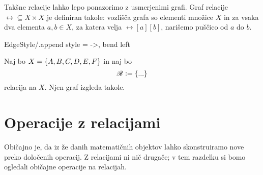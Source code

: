                Takšne relacije lahko lepo ponazorimo z usmerjenimi grafi. Graf relacije $\rel \subseteq X \times X$ je definiran takole: vozlišča grafa so elementi množice $X$ in za vsaka dva elementa $a, b \in X$, za katera velja $\rel[a][b]$, narišemo puščico od $a$ do $b$.

                \GraphInit[vstyle = Normal]
                \tikzset
                {
                        EdgeStyle/.append style = {->, bend left}
                }

                \begin{zgled}\label{ZGLED: graf relacije}
                        Naj bo $X = \set{A, B, C, D, E, F}$ in naj bo
                        \[\rel \dfeq \set{...}\]
                        relacija na $X$. Njen graf izgleda takole.

                \end{zgled}


        \section{Operacije z relacijami}\label{RAZDELEK: Operacije z relacijami}

                Običajno je, da iz že danih matematičnih objektov lahko skonstruiramo nove preko določenih operacij. Z relacijami ni nič drugače; v tem razdelku si bomo ogledali običajne operacije na relacijah.

